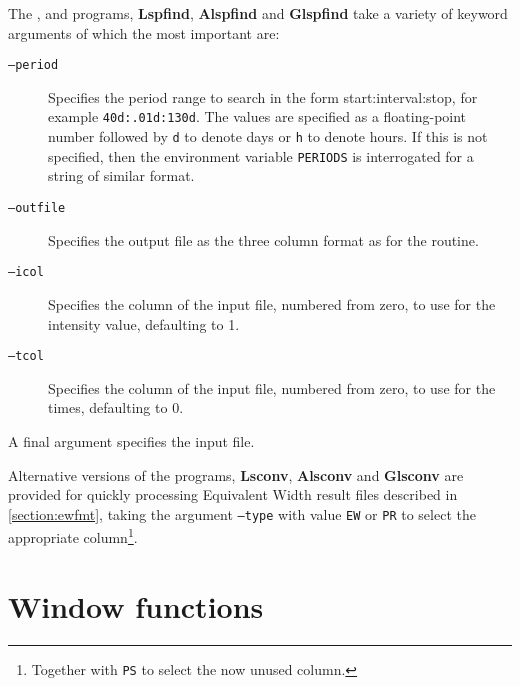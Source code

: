 The {\scipy}, {\astroml} and {\gatspy} programs, \textbf{Lspfind}, \textbf{Alspfind} and \textbf{Glspfind} take a
variety of keyword arguments of which the most important are:

\begin{description}

\item[\tt{--period}] Specifies the period range to search in the form start:interval:stop, for example
  \texttt{40d:.01d:130d}. The values are specified as a floating-point number followed by \texttt{d} to denote days or \texttt{h} to
  denote hours. If this is not specified, then the environment variable \texttt{PERIODS} is interrogated for a string of
  similar format.

\item[\tt{--outfile}] Specifies the output file as the three column format as for the {\numrecs} routine.

\item[\tt{--icol}] Specifies the column of the input file, numbered from zero, to use for the intensity value, defaulting to
  1.

\item[\tt{--tcol}] Specifies the column of the input file, numbered from zero, to use for the times, defaulting to 0.

\end{description}

A final argument specifies the input file.

Alternative versions of the programs, \textbf{Lsconv}, \textbf{Alsconv} and \textbf{Glsconv} are provided for quickly
processing Equivalent Width result files described in \ref{section:ewfmt}, taking the argument \texttt{--type} with value \texttt{EW} or \texttt{PR} to
select the appropriate column\footnote{Together with \texttt{PS} to select the now unused column.}.

\section{Window functions}



